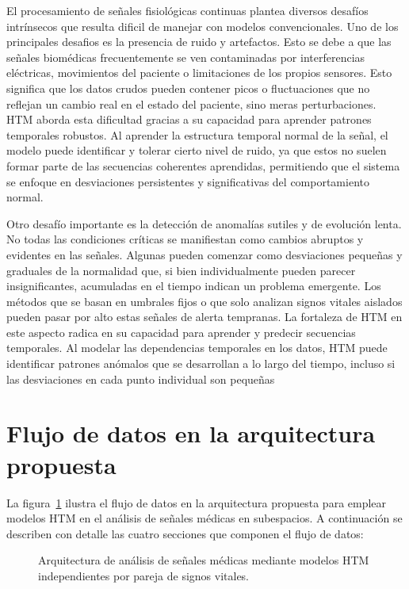 El procesamiento de señales fisiológicas continuas plantea diversos desafíos intrínsecos que resulta dificil de manejar con modelos convencionales. Uno de los principales desafios es la presencia de ruido y artefactos. Esto se debe a que las señales biomédicas frecuentemente se ven contaminadas por interferencias eléctricas, movimientos del paciente o limitaciones de los propios sensores. Esto significa que los datos crudos pueden contener picos o fluctuaciones que no reflejan un cambio real en el estado del paciente, sino meras perturbaciones. HTM aborda esta dificultad gracias a su capacidad para aprender patrones temporales robustos. Al aprender la estructura temporal normal de la señal, el modelo puede identificar y tolerar cierto nivel de ruido, ya que estos no suelen formar parte de las secuencias coherentes aprendidas, permitiendo que el sistema se enfoque en desviaciones persistentes y significativas del comportamiento normal.

Otro desafío importante es la detección de anomalías sutiles y de evolución lenta. No todas las condiciones críticas se manifiestan como cambios abruptos y evidentes en las señales. Algunas pueden comenzar como desviaciones pequeñas y graduales de la normalidad que, si bien individualmente pueden parecer insignificantes, acumuladas en el tiempo indican un problema emergente. Los métodos que se basan en umbrales fijos o que solo analizan signos vitales aislados pueden pasar por alto estas señales de alerta tempranas. La fortaleza de HTM en este aspecto radica en su capacidad para aprender y predecir secuencias temporales. Al modelar las dependencias temporales en los datos, HTM puede identificar patrones anómalos que se desarrollan a lo largo del tiempo, incluso si las desviaciones en cada punto individual son pequeñas \parencite{AHMAD2017134}
\medskip

\section{Flujo de datos en la arquitectura propuesta}

La figura~\ref{fig:arquitectura_subespacios} ilustra el flujo de datos en la arquitectura propuesta para emplear modelos HTM en el análisis de señales médicas en subespacios. A continuación se describen con detalle las cuatro secciones que componen el flujo de datos:

\begin{figure}[ht]
  \centering
  
  \captionsetup{justification=centering}
  \caption{Arquitectura de análisis de señales médicas mediante modelos HTM independientes por pareja de signos vitales.}
  \label{fig:arquitectura_subespacios}
\end{figure}

